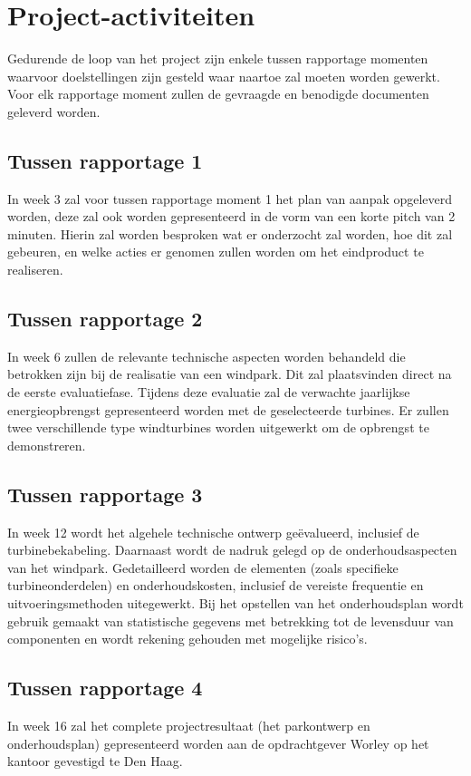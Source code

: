 \section{Project-activiteiten}
Gedurende de loop van het project zijn enkele tussen rapportage momenten waarvoor doelstellingen zijn gesteld waar naartoe zal moeten worden gewerkt. Voor elk rapportage moment zullen de gevraagde en benodigde documenten geleverd worden.

\subsection{Tussen rapportage 1}
In week 3 zal voor tussen rapportage moment 1 het plan van aanpak opgeleverd worden, deze zal ook worden gepresenteerd in de vorm van een korte pitch van 2 minuten. Hierin zal worden besproken wat er onderzocht zal worden, hoe dit zal gebeuren, en welke acties er genomen zullen worden om het eindproduct te realiseren.

\subsection{Tussen rapportage 2}
In week 6 zullen de relevante technische aspecten worden behandeld die betrokken zijn bij de realisatie van een windpark. Dit zal plaatsvinden direct na de eerste evaluatiefase. Tijdens deze evaluatie zal de verwachte jaarlijkse energieopbrengst gepresenteerd worden met de geselecteerde turbines. Er zullen twee verschillende type windturbines worden uitgewerkt om de opbrengst te demonstreren.

\subsection{Tussen rapportage 3}
In week 12 wordt het algehele technische ontwerp geëvalueerd, inclusief de turbinebekabeling. Daarnaast wordt de nadruk gelegd op de onderhoudsaspecten van het windpark. Gedetailleerd worden de elementen (zoals specifieke turbineonderdelen) en onderhoudskosten, inclusief de vereiste frequentie en uitvoeringsmethoden uitegewerkt. Bij het opstellen van het onderhoudsplan wordt gebruik gemaakt van statistische gegevens met betrekking tot de levensduur van componenten en wordt rekening gehouden met mogelijke risico's\cite{algemene-kosten-windpark}.

\subsection{Tussen rapportage 4}
In week 16 zal het complete projectresultaat (het parkontwerp en onderhoudsplan) gepresenteerd worden aan de opdrachtgever Worley op het kantoor gevestigd te Den Haag.